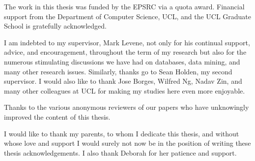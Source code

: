 
\begin{acknowledgements}

The work in this thesis was funded by the EPSRC via a quota award. 
Financial support from the Department of Computer Science, UCL, and
the UCL Graduate School is gratefully acknowledged.

\medskip

I am indebted to my supervisor, Mark Levene, not only for his
continual support, advice, and encouragement, throughout the term of
my research but also for the numerous stimulating discussions we have had
on databases, data mining, and many other research issues.  Similarly,
thanks go to Sean Holden, my second supervisor. I would also
like to thank Jose Borges, Wilfred Ng, Nadav Zin, and many other
colleagues at UCL for making my studies here even more enjoyable.

\medskip

Thanks to the various anonymous reviewers of our papers who have
unknowingly improved the content of this thesis.

\medskip

I would like to thank my parents,
to whom I dedicate this thesis, and without
whose love and support I would surely not now be in
the position of writing these thesis acknowledgements. I also thank
Deborah for her patience and support.  

\end{acknowledgements}

